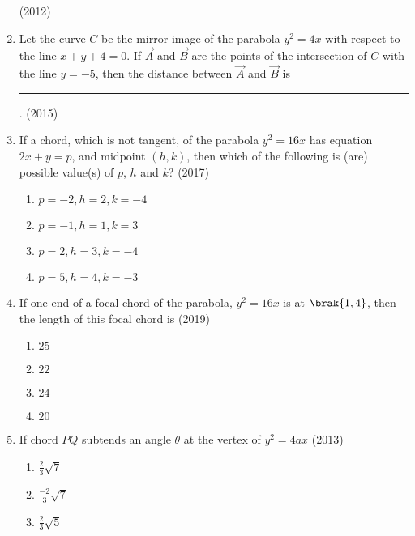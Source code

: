 \begin{enumerate}[label=\thesubsection.\arabic*.,ref=\thesubsection.\theenumi]
\hfill(2012)
\item Let the curve $C$ be the mirror image of the parabola $y^2=4x$ with respect to the line $x+y+4=0$. If $\Vec{A}$ and $\Vec{B}$ are the points of the intersection of $C$ with the line $y=-5$, then the distance between $\Vec{A}$ and $\Vec{B}$ is \rule{1cm}{0.1pt}.
\hfill(2015)
      \item If a chord, which is not tangent, of the parabola $y^2=16x$ has equation $2x+y=p$, and midpoint $(h,k)$, then which of the following is (are) possible value(s) of $p$, $h$ and $k$? 
	      \hfill(2017)
\begin{multicols}{2}
	       \begin{enumerate}
		      \item $p=-2,h=2,k=-4$
		      \item $p=-1,h=1,k=3$
		      \item $p=2,h=3,k=-4$
		      \item $p=5,h=4,k=-3$
	       \end{enumerate}
\end{multicols}
\item If one end of a focal chord of the parabola, $y^2=16x$ is at $\brak{1,4}$, then the length of this focal chord is 
     \hfill{(2019)}
\begin{multicols}{4}
	\begin{enumerate}
    		\item $25$
    		\item $22$
    		\item $24$
    		\item $20$
	\end{enumerate}
\end{multicols}    

\item If chord $PQ$ subtends an angle $\theta$  at the vertex of $y^2=4ax$
\hfill(2013)

\begin{multicols}{4}
\begin{enumerate}
    \item $\frac{2}{3}\sqrt{7}$
    
    \item $\frac{-2}{3}\sqrt{7}$
    
    \item $\frac{2}{3}\sqrt{5}$
    

\end{enumerate}
\end{multicols}
\end{enumerate}

